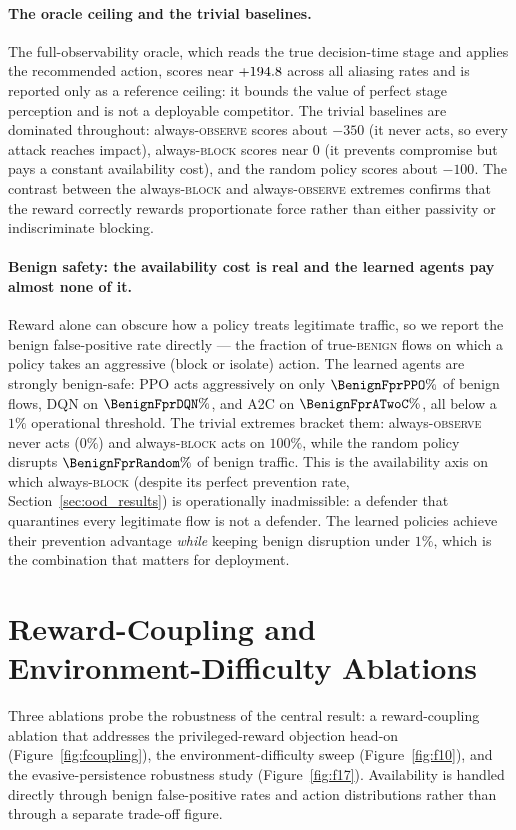 \paragraph{The oracle ceiling and the trivial baselines.} The full-observability oracle, which reads the true decision-time stage and applies the recommended action, scores near $+194.8$ across all aliasing rates and is reported only as a reference ceiling: it bounds the value of perfect stage perception and is not a deployable competitor. The trivial baselines are dominated throughout: always-\textsc{observe} scores about $-350$ (it never acts, so every attack reaches impact), always-\textsc{block} scores near $0$ (it prevents compromise but pays a constant availability cost), and the random policy scores about $-100$. The contrast between the always-\textsc{block} and always-\textsc{observe} extremes confirms that the reward correctly rewards proportionate force rather than either passivity or indiscriminate blocking.

\paragraph{Benign safety: the availability cost is real and the learned agents pay almost none of it.} Reward alone can obscure how a policy treats legitimate traffic, so we report the benign false-positive rate directly --- the fraction of true-\textsc{benign} flows on which a policy takes an aggressive (block or isolate) action. The learned agents are strongly benign-safe: PPO acts aggressively on only $\BenignFprPPO\%$ of benign flows, DQN on $\BenignFprDQN\%$, and A2C on $\BenignFprATwoC\%$, all below a $1\%$ operational threshold. The trivial extremes bracket them: always-\textsc{observe} never acts ($0\%$) and always-\textsc{block} acts on $100\%$, while the random policy disrupts $\BenignFprRandom\%$ of benign traffic. This is the availability axis on which always-\textsc{block} (despite its perfect prevention rate, Section~\ref{sec:ood_results}) is operationally inadmissible: a defender that quarantines every legitimate flow is not a defender. The learned policies achieve their prevention advantage \emph{while} keeping benign disruption under $1\%$, which is the combination that matters for deployment.

\clearpage
\section{Reward-Coupling and Environment-Difficulty Ablations}\label{sec:ablation_results}
Three ablations probe the robustness of the central result: a reward-coupling ablation that addresses the privileged-reward objection head-on (Figure~\ref{fig:fcoupling}), the environment-difficulty sweep (Figure~\ref{fig:f10}), and the evasive-persistence robustness study (Figure~\ref{fig:f17}). Availability is handled directly through benign false-positive rates and action distributions rather than through a separate trade-off figure.

